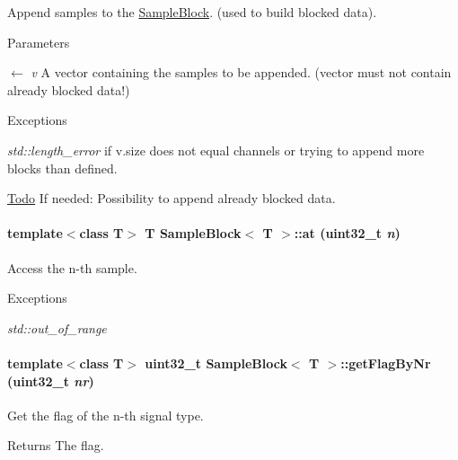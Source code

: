 Append samples to the \hyperlink{class_sample_block}{SampleBlock}. (used to build blocked data). 
\begin{DoxyParams}{Parameters}
\item[\mbox{$\leftarrow$} {\em v}]A vector containing the samples to be appended. (vector must not contain already blocked data!) \end{DoxyParams}

\begin{DoxyExceptions}{Exceptions}
\item[{\em std::length\_\-error}]if v.size does not equal channels or trying to append more blocks than defined. \end{DoxyExceptions}
\begin{Desc}
\item[\hyperlink{todo__todo000011}{Todo}]If needed: Possibility to append already blocked data. \end{Desc}
\hypertarget{class_sample_block_a7f15495c776af47b315a6b343c664fa5}{
\paragraph[{at}]{\setlength{\rightskip}{0pt plus 5cm}template$<$class T$>$ T {\bf SampleBlock}$<$ T $>$::at (uint32\_\-t {\em n})}\hfill}
\label{class_sample_block_a7f15495c776af47b315a6b343c664fa5}


Access the n-\/th sample. 
\begin{DoxyExceptions}{Exceptions}
\item[{\em std::out\_\-of\_\-range}]\end{DoxyExceptions}
\hypertarget{class_sample_block_ac07d28e24acdb26340ad96f7810be414}{
\paragraph[{getFlagByNr}]{\setlength{\rightskip}{0pt plus 5cm}template$<$class T$>$ uint32\_\-t {\bf SampleBlock}$<$ T $>$::getFlagByNr (uint32\_\-t {\em nr})}\hfill}
\label{class_sample_block_ac07d28e24acdb26340ad96f7810be414}


Get the flag of the n-\/th signal type. \begin{DoxyReturn}{Returns}
The flag. 
\end{DoxyReturn}

